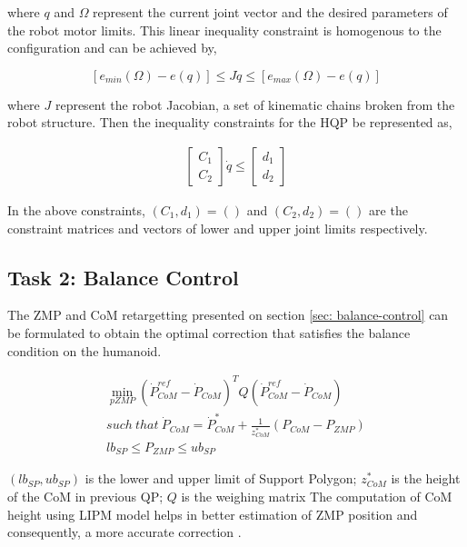 where $q$ and $\Omega$ represent the current joint vector and the desired parameters of the robot motor limits. 
This linear inequality constraint is homogenous to the configuration and can be achieved by,

\begin{equation}
    \label{eq: joint-limit-2}
    [e_{min}(\Omega) - e(q)] \le J\dot{q} \le [e_{max}(\Omega) - e(q)]
\end{equation}

where $J$ represent the robot Jacobian, a set of kinematic chains broken from the robot structure.
Then the inequality constraints for the HQP be represented as,

\begin{align}
    \label{eq: joint-limit-3}
    \begin{bmatrix}
        C_1 \\ C_2
    \end{bmatrix} \dot{q} \le 
    \begin{bmatrix}
        d_1 \\ d_2
    \end{bmatrix}
\end{align}

In the above constraints, $(C_1, d_1) = ()$ and $(C_2, d_2) = ()$ are the constraint matrices and vectors of lower and upper joint limits respectively.

\subsection[Balance Control]{Task 2: Balance Control}

The ZMP and CoM retargetting presented on section \ref{sec: balance-control} can be formulated to obtain the optimal correction that 
satisfies the balance condition on the humanoid.

\begin{eqnarray}
    \label{eq: balance-task-1}
    \min_{pZMP} (\dot{P}_{CoM}^{ref} - \dot{P}_{CoM})^T Q (\dot{P}_{CoM}^{ref} - \dot{P}_{CoM}) \\
    \mathit{such \ that} \ \dot{P}_{CoM} = \dot{P}_{CoM}^* + \frac{1}{z^*_{CoM}}(P_{CoM} - P_{ZMP}) \\
    lb_{SP} \le P_{ZMP} \leq ub_{SP}
\end{eqnarray}

$(lb_{SP}, ub_{SP})$ is the lower and upper limit of Support Polygon; $z_{CoM}^*$ is the height of the CoM in previous QP; $Q$ is the weighing matrix
The computation of CoM height using LIPM model helps in better estimation of ZMP position and consequently, a more accurate correction \cite{gucci:hal-01895145}.

